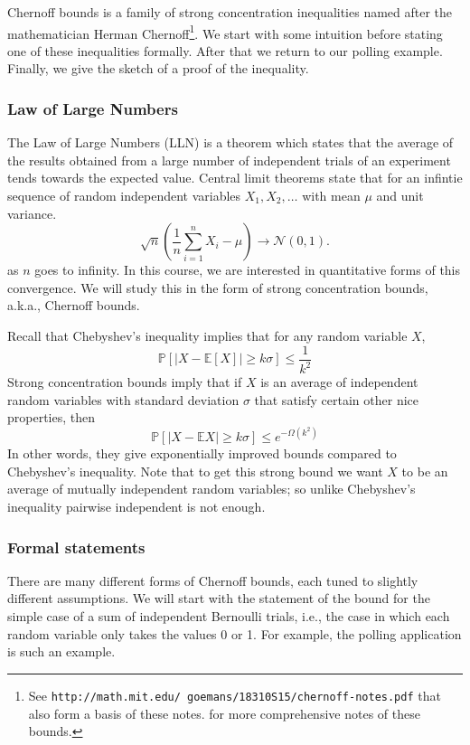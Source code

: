 Chernoff bounds is a family of strong concentration inequalities named after the mathematician Herman Chernoff\footnote{See \texttt{http://math.mit.edu/\string~goemans/18310S15/chernoff-notes.pdf} that also form a basis of these notes. for more comprehensive notes of these bounds.}. We start with some intuition before stating one of these inequalities formally. After that we return to our polling example. Finally, we give the sketch of a proof of the inequality.

\subsubsection{Law of Large Numbers}

The Law of Large Numbers (LLN) is a theorem which states that the average of the results obtained from a large number of independent trials of an experiment tends towards the expected value. Central limit theorems state that for an infintie sequence of random independent variables $X_1,X_2,\ldots$ with mean $\mu$ and unit variance.
\begin{equation}\label{eq:clt}
  \sqrt{n}\left(\frac1n\sum_{i=1}^n X_i-\mu\right)\to\mathcal{N}(0,1).
\end{equation}
as $n$ goes to infinity. In this course, we are interested in quantitative forms of this convergence. We will study this in the form of strong concentration bounds, a.k.a., Chernoff bounds.

Recall that Chebyshev's inequality implies that for any random variable $X$,
\begin{equation}\label{eq:cheb}
  \mathbb{P}\left[|X-\mathbb{E}[X]|\ge k\sigma\right]\le\frac{1}{k^2}
\end{equation}
Strong concentration bounds imply that if $X$ is an average of independent random variables with standard deviation $\sigma$ that satisfy certain other nice properties, then
\[
  \mathbb{P}\left[|X-\mathbb{E}X|\ge k\sigma\right]\le e^{-\Omega(k^2)}
\]
In other words, they give exponentially improved bounds compared to Chebyshev's inequality. Note that to get this strong bound we want $X$ to be an average of mutually independent random variables; so unlike Chebyshev's inequality pairwise independent is not enough.

\subsubsection{Formal statements}

There are many different forms of Chernoff bounds, each tuned to slightly different assumptions. We will start with the statement of the bound for the simple case of a sum of independent Bernoulli trials, i.e., the case in which each random variable only takes the values 0 or 1. For example, the polling application is such an example.

